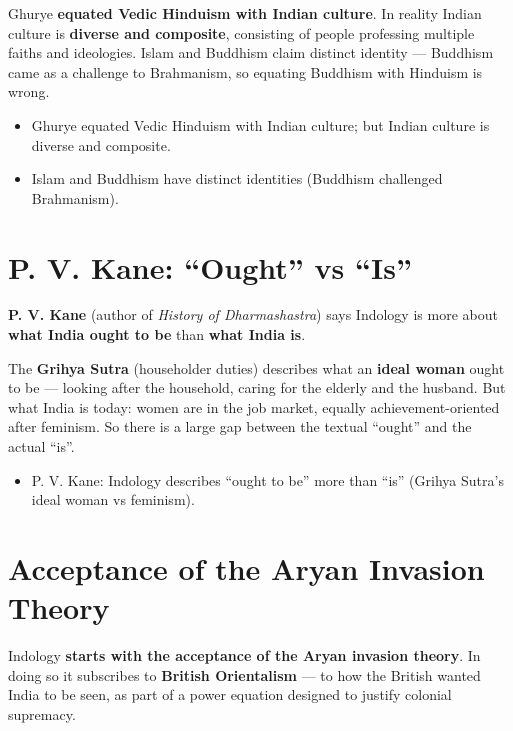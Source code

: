 Ghurye \textbf{equated Vedic Hinduism with Indian culture}. In reality Indian culture is \textbf{diverse and composite}, consisting of people professing multiple faiths and ideologies. Islam and Buddhism claim distinct identity --- Buddhism came as a challenge to Brahmanism, so equating Buddhism with Hinduism is wrong.

\begin{QuickRevision}
\begin{itemize}
\item Ghurye equated Vedic Hinduism with Indian culture; but Indian culture is diverse and composite.
\item Islam and Buddhism have distinct identities (Buddhism challenged Brahmanism).
\end{itemize}
\end{QuickRevision}

\section{P. V. Kane: ``Ought'' vs ``Is''}

\textbf{P. V. Kane} (author of \emph{History of Dharmashastra}) says Indology is more about \textbf{what India ought to be} than \textbf{what India is}.

\begin{ExampleBox}
The \textbf{Grihya Sutra} (householder duties) describes what an \textbf{ideal woman} ought to be --- looking after the household, caring for the elderly and the husband. But what India is today: women are in the job market, equally achievement-oriented after feminism. So there is a large gap between the textual ``ought'' and the actual ``is''.
\end{ExampleBox}

\begin{QuickRevision}
\begin{itemize}
\item P. V. Kane: Indology describes ``ought to be'' more than ``is'' (Grihya Sutra's ideal woman vs feminism).
\end{itemize}
\end{QuickRevision}

\section{Acceptance of the Aryan Invasion Theory}

Indology \textbf{starts with the acceptance of the Aryan invasion theory}. In doing so it subscribes to \textbf{British Orientalism} --- to how the British wanted India to be seen, as part of a power equation designed to justify colonial supremacy.

